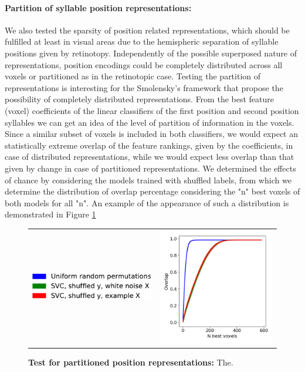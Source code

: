 \paragraph{Partition of syllable position representations:}
We also tested the sparsity of position related representations, which should be fulfilled at least in visual areas due to the hemispheric separation of syllable positions given by retinotopy.
Independently of the possible superposed nature of representations, position encodings could be completely distributed across all voxels or partitioned as in the retinotopic case.
Testing the partition of representations is interesting for the Smolensky's framework that propose the possibility of completely distributed representations.
From the best feature (voxel) coefficients of the linear classifiers of the first position and second position syllables we can get an idea of the level of partition of information in the voxels.
Since a similar subset of voxels is included in both classifiers, we would expect an statistically extreme overlap of the feature rankings, given by the coefficients, in case of distributed representations, while we would expect less overlap than that given by change in case of partitioned representations.
We determined the effects of chance by considering the models trained with shuffled labels, from which we determine the distribution of overlap percentage considering the "n" best voxels of both models for all "n".
An example of the appearance of such a distribution is demonstrated in Figure \ref{fig:segregation_test}


\begin{figure}[ht]
\scriptsize
\hspace{-4ex}
\begin{tabular}{cl}
{\includegraphics[width=0.3\linewidth]{figures/part_II/example_legend2.pdf}}
\hspace{-1ex}
&{\includegraphics[width=0.6\linewidth]{figures/part_II/theoretical_example2.png}}
\hspace{-1ex}\\
\end{tabular}
\caption{\textbf{Test for partitioned position representations:}
The.}
\label{fig:segregation_test}
\end{figure}
